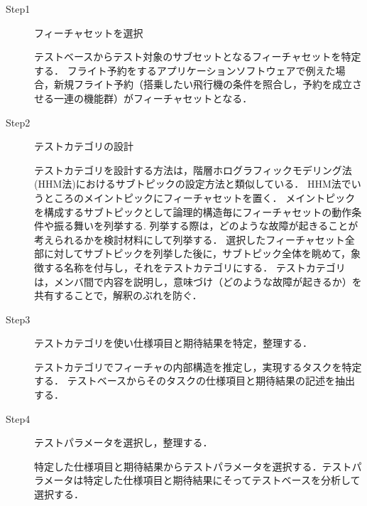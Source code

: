\begin{description}
\item[Step1] フィーチャセットを選択

テストベースからテスト対象のサブセットとなるフィーチャセットを特定する．
フライト予約をするアプリケーションソフトウェアで例えた場合，新規フライト予約（搭乗したい飛行機の条件を照合し，予約を成立させる一連の機能群）がフィーチャセットとなる．

\item[Step2] テストカテゴリの設計

テストカテゴリを設計する方法は，階層ホログラフィックモデリング法(HHM法)におけるサブトピックの設定方法と類似している\cite{HHM2002}．
HHM法でいうところのメイントピックにフィーチャセットを置く．
メイントピックを構成するサブトピックとして論理的構造毎にフィーチャセットの動作条件や振る舞いを列挙する.
列挙する際は，どのような故障が起きることが考えられるかを検討材料にして列挙する．
選択したフィーチャセット全部に対してサブトピックを列挙した後に，サブトピック全体を眺めて，象徴する名称を付与し，それをテストカテゴリにする．
テストカテゴリは，メンバ間で内容を説明し，意味づけ（どのような故障が起きるか）を共有することで，解釈のぶれを防ぐ．


\item[Step3] テストカテゴリを使い仕様項目と期待結果を特定，整理する．

テストカテゴリでフィーチャの内部構造を推定し，実現するタスクを特定する．
テストベースからそのタスクの仕様項目と期待結果の記述を抽出する．


\item[Step4] テストパラメータを選択し，整理する．

特定した仕様項目と期待結果からテストパラメータを選択する．テストパラメータは特定した仕様項目と期待結果にそってテストベースを分析して選択する．

\end{description}



